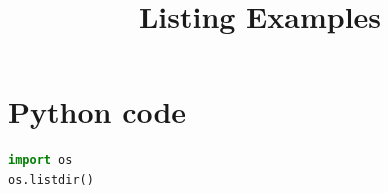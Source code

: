 \documentclass{article}
\title{Listing Examples}
\begin{document}
\section{Python code}

\begin{lstlisting}[language=python]
import os
os.listdir()
\end{lstlisting}
\end{document}
